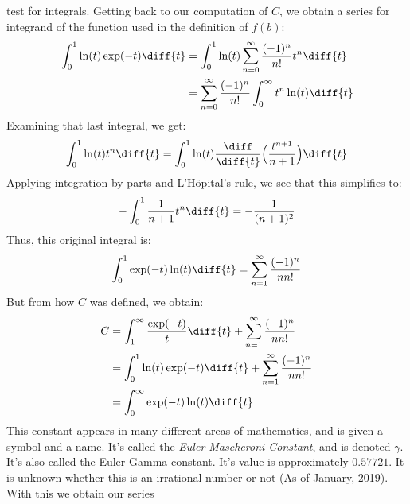 \documentclass[crop=false,class=book,oneside]{standalone}
\begin{document}
            test for integrals. Getting back to our computation
            of $C$, we obtain a series for integrand of the function
            used in the definition of $f(b)$:
            \begin{align}
                \int_{0}^{1}\ln(t)\exp(-t)\diff{t}
                &=\int_{0}^{1}\ln(t)\sum_{n=0}^{\infty}
                    \frac{(-1)^{n}}{n!}t^{n}\diff{t}\\
                &=\sum_{n=0}^{\infty}\frac{(-1)^{n}}{n!}
                \int_{0}^{\infty}t^{n}\ln(t)\diff{t}
            \end{align}
            Examining that last integral, we get:
            \begin{equation}
                \int_{0}^{1}\ln(t)t^{n}\diff{t}
                =\int_{0}^{1}\ln(t)\frac{\diff}{\diff{t}}
                    \Big(\frac{t^{n+1}}{n+1}\Big)\diff{t}
            \end{equation}
            Applying integration by parts and L'H\"{o}pital's rule,
            we see that this simplifies to:
            \begin{equation}
                -\int_{0}^{1}\frac{1}{n+1}t^{n}\diff{t}
                =-\frac{1}{(n+1)^{2}}
            \end{equation}
            Thus, this original integral is:
            \begin{equation}
                \int_{0}^{1}\exp(-t)\ln(t)\diff{t}
                =\sum_{n=1}^{\infty}\frac{(-1)^{n}}{nn!}
            \end{equation}
            But from how $C$ was defined, we obtain:
            \begin{align}
                C&=\int_{1}^{\infty}\frac{\exp(-t)}{t}\diff{t}
                +\sum_{n=1}^{\infty}\frac{(-1)^{n}}{nn!}\\
                &=\int_{0}^{1}\ln(t)\exp(-t)\diff{t}
                +\sum_{n=1}^{\infty}\frac{(-1)^{n}}{nn!}\\
                &=\int_{0}^{\infty}\exp(-t)\ln(t)\diff{t}
            \end{align}
            This constant appears in many different areas of
            mathematics, and is given a symbol and a name.
            It's called the
            \textit{Euler-Mascheroni Constant}, and is
            denoted $\gamma$. It's also called the Euler Gamma
            constant. It's value is approximately $0.57721$. It is
            unknown whether this is an irrational number or not
            (As of January, 2019). With this we obtain our series
\end{document}
